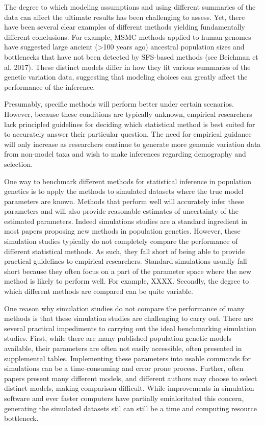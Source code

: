 \documentclass[12pt,halfline,a4paper]{ouparticle}
\begin{document}
The degree to which modeling assumptions and using different summaries of the
data can affect the ultimate results has been challenging to assess. Yet, there
have been several clear examples of different methods yielding fundamentally
different conclusions. For example, MSMC methods applied to human genomes have
suggested large ancient (>100 years ago) ancestral population sizes and
bottlenecks that have not been detected by SFS-based methods (see Beichman et
al. 2017). These distinct models differ in how they fit various summaries of the
genetic variation data, suggesting that modeling choices can greatly affect the
performance of the inference.

Presumably, specific methods will perform better under certain scenarios.
However, because these conditions are typically unknown, empirical researchers
lack principled guidelines for deciding which statistical method is best suited
for to accurately answer their particular question. The need for empirical
guidance will only increase as researchers continue to generate more genomic
variation data from non-model taxa and wish to make inferences regarding
demography and selection.

One way to benchmark different methods for statistical inference in population
genetics is to apply the methods to simulated datasets where the true model
parameters are known. Methods that perform well will accurately infer these
parameters and will also provide reasonable estimates of uncertainty of the
estimated parameters. Indeed simulations studies are a standard ingredient in
most papers proposing new methods in population genetics. However, these
simulation studies typically do not completely compare the performance of
different statistical methods. As such, they fall short of being able to provide
practical guidelines to empirical researchers. Standard simulations usually fall
short because they often focus on a part of the parameter space where the new
method is likely to perform well. For example, XXXX. Secondly, the degree to
which different methods are compared can be quite variable.

One reason why simulation studies do not compare the performance of many methods
is that these simulation studies are challenging to carry out. There are several
practical impediments to carrying out the ideal benchmarking simulation studies.
First, while there are many published population genetic models available, their
parameters are often not easily accessible, often presented in supplemental
tables. Implementing these parameters into usable commands for simulations can
be a time-consuming and error prone process. Further, often papers present many
different models, and different authors may choose to select distinct models,
making comparison difficult. While improvements in simulation software and ever
faster computers have partially emialoritated this concern, generating the
simulated datasets stil can still be a time and computing resource bottleneck.
\end{document}
